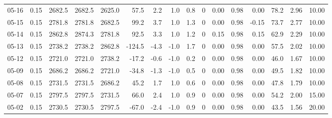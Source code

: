 \begin{threeparttable}
{\begin{tabular}{lrrrrrrrrrrrrrrr}
  05-16 &     0.15 & 2682.5 & 2682.5 & 2625.0 &       57.5 &            2.2 &                      1.0 &                 0.8 &              0 &       0.00 &      0.98 &           0.00 &             78.2 &            2.96 &                  10.00 \\
  05-15 &     0.15 & 2781.8 & 2781.8 & 2682.5 &       99.2 &            3.7 &                      1.0 &                 1.3 &              0 &       0.00 &      0.98 &          -0.15 &             73.7 &            2.77 &                  10.00 \\
  05-14 &     0.15 & 2862.8 & 2874.3 & 2781.8 &       92.5 &            3.3 &                      1.0 &                 1.2 &              0 &       0.15 &      0.98 &           0.15 &             62.9 &            2.29 &                  10.00 \\
  05-13 &     0.15 & 2738.2 & 2738.2 & 2862.8 &     -124.5 &           -4.3 &                     -1.0 &                 1.7 &              0 &       0.00 &      0.98 &           0.00 &             57.5 &            2.02 &                  10.00 \\
  05-12 &     0.15 & 2721.0 & 2721.0 & 2738.2 &      -17.2 &           -0.6 &                     -1.0 &                 0.2 &              0 &       0.00 &      0.98 &           0.00 &             46.0 &            1.67 &                  10.00 \\
  05-09 &     0.15 & 2686.2 & 2686.2 & 2721.0 &      -34.8 &           -1.3 &                     -1.0 &                 0.5 &              0 &       0.00 &      0.98 &           0.00 &             49.5 &            1.82 &                  10.00 \\
  05-08 &     0.15 & 2731.5 & 2731.5 & 2686.2 &       45.2 &            1.7 &                      1.0 &                 0.6 &              0 &       0.00 &      0.98 &           0.00 &             47.8 &            1.79 &                  10.00 \\
  05-07 &     0.15 & 2797.5 & 2797.5 & 2731.5 &       66.0 &            2.4 &                      1.0 &                 0.9 &              0 &       0.00 &      0.98 &           0.00 &             54.2 &            2.00 &                  15.00 \\
  05-02 &     0.15 & 2730.5 & 2730.5 & 2797.5 &      -67.0 &           -2.4 &                     -1.0 &                 0.9 &              0 &       0.00 &      0.98 &           0.00 &             43.5 &            1.56 &                  20.00 \\

\end{tabular}}
\end{threeparttable}

